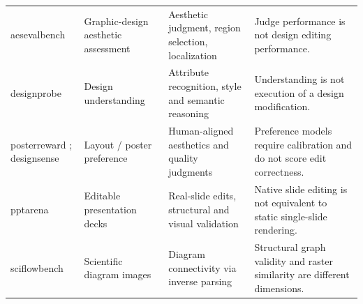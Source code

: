 \begin{table}[t]
\begin{tabularx}{\textwidth}{@{}p{}p{}p{}X@{}}
\ac{aesevalbench} \citep{an2026aeseval} & Graphic-design aesthetic assessment & Aesthetic judgment, region selection, localization & Judge performance is not design editing performance.\\
\ac{designprobe} \citep{designprobe2024} & Design understanding & Attribute recognition, style and semantic reasoning & Understanding is not execution of a design modification.\\
\ac{posterreward} \citep{posterreward2026}; \ac{designsense} \citep{designsense2026} & Layout / poster preference & Human-aligned aesthetics and quality judgments & Preference models require calibration and do not score edit correctness.\\
\ac{pptarena} \citep{pptarena2025} & Editable presentation decks & Real-slide edits, structural and visual validation & Native slide editing is not equivalent to static single-slide rendering.\\
\ac{sciflowbench} \citep{sciflowbench2026} & Scientific diagram images & Diagram connectivity via inverse parsing & Structural graph validity and raster similarity are different dimensions.\\
\bottomrule
\end{tabularx}
\end{table}
